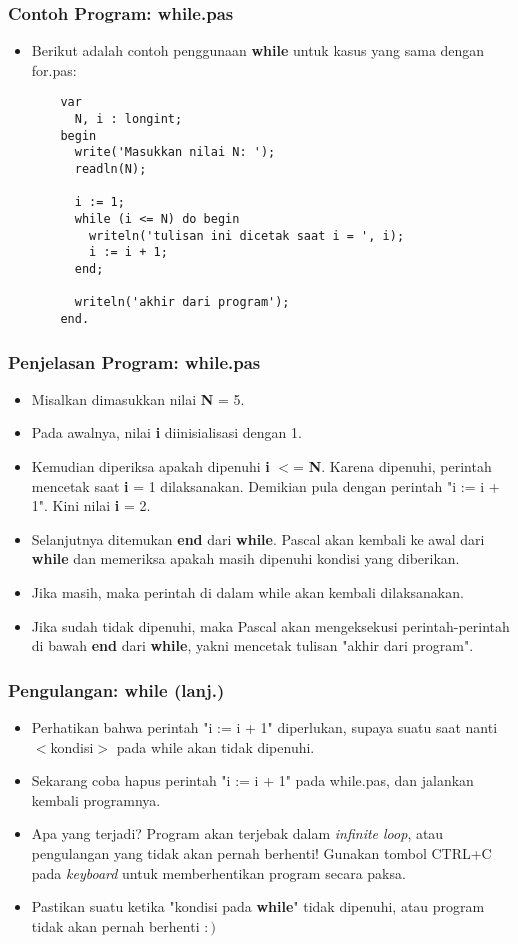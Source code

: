 \documentclass{beamer}
\begin{document}
\begin{frame}[fragile]
\frametitle{Contoh Program: while.pas}
\begin{itemize}
  \item Berikut adalah contoh penggunaan \textbf{while} untuk kasus yang sama dengan for.pas:
  \begin{lstlisting}
    var
      N, i : longint;
    begin
      write('Masukkan nilai N: ');
      readln(N);

      i := 1;
      while (i <= N) do begin
        writeln('tulisan ini dicetak saat i = ', i);
        i := i + 1;
      end;

      writeln('akhir dari program');
    end.
  \end{lstlisting}
\end{itemize}
\end{frame}

\begin{frame}
\frametitle{Penjelasan Program: while.pas}
\begin{itemize}
  \item Misalkan dimasukkan nilai \textbf{N} = 5.
  \item Pada awalnya, nilai \textbf{i} diinisialisasi dengan 1.
  \item Kemudian diperiksa apakah dipenuhi \textbf{i} $<$= \textbf{N}. Karena dipenuhi, perintah mencetak saat \textbf{i} = 1 dilaksanakan. Demikian pula dengan perintah "i := i + 1". Kini nilai \textbf{i} = 2.
  \item Selanjutnya ditemukan \textbf{end} dari \textbf{while}. Pascal akan kembali ke awal dari \textbf{while} dan memeriksa apakah masih dipenuhi kondisi yang diberikan.
  \item Jika masih, maka perintah di dalam while akan kembali dilaksanakan.
  \item Jika sudah tidak dipenuhi, maka Pascal akan mengeksekusi perintah-perintah di bawah \textbf{end} dari \textbf{while}, yakni mencetak tulisan "akhir dari program".
\end{itemize}
\end{frame}

\begin{frame}
\frametitle{Pengulangan: while (lanj.)}
\begin{itemize}
  \item Perhatikan bahwa perintah "i := i + 1" diperlukan, supaya suatu saat nanti $<$kondisi$>$ pada while akan tidak dipenuhi.
  \item Sekarang coba hapus perintah "i := i + 1" pada while.pas, dan jalankan kembali programnya.
  \item Apa yang terjadi? Program akan terjebak dalam \alert{\textit{infinite loop}}, atau \alert{pengulangan yang tidak akan pernah berhenti}! Gunakan tombol CTRL+C pada \textit{keyboard} untuk memberhentikan program secara paksa.
  \item Pastikan suatu ketika "kondisi pada \textbf{while}" tidak dipenuhi, atau program tidak akan pernah berhenti $:)$
\end{itemize}
\end{frame}
\end{document}
